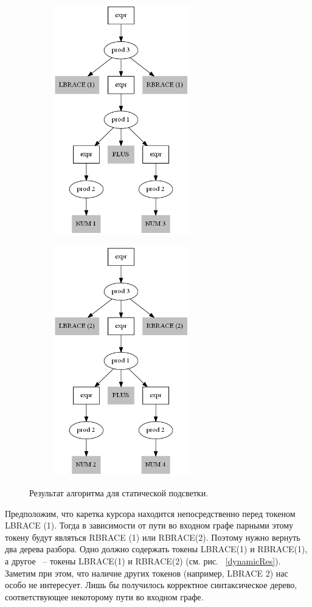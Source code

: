 \begin{figure}[h]
    \centering
    \begin{subfigure}[h]{0.25\textwidth}
         \includegraphics[height=100mm]{Pictures/Dynamic_StaticRes1.png}
    \end{subfigure}
    \qquad \qquad
    \begin{subfigure}[h]{0.25\textwidth}
         \includegraphics[height=100mm]{Pictures/Dynamic_StaticRes2.png}
    \end{subfigure}
    \caption{Результат алгоритма для статической подсветки.}
    \label{staticRes}
\end{figure}

Предположим, что каретка курсора находится непосредственно перед токеном LBRACE (1). Тогда в зависимости от пути во входном графе парными этому токену будут являться RBRACE (1) или RBRACE(2). Поэтому нужно вернуть два дерева разбора. Одно должно содержать токены LBRACE(1) и RBRACE(1), а другое ~-- токены LBRACE(1) и RBRACE(2) (см. рис. ~\ref{dynamicRes}). Заметим при этом, что наличие других токенов (например, LBRACE 2) нас особо не интересует. Лишь бы получилось корректное синтаксическое дерево, соответствующее некоторому пути во входном графе.

